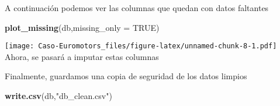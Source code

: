 \documentclass[
]{article}
\newenvironment{Shaded}{\begin{snugshade}}{\end{snugshade}}
\newcommand{\CommentTok}[1]{\textcolor[rgb]{0.56,0.35,0.01}{\textit{#1}}}
\newcommand{\DataTypeTok}[1]{\textcolor[rgb]{0.13,0.29,0.53}{#1}}
\newcommand{\KeywordTok}[1]{\textcolor[rgb]{0.13,0.29,0.53}{\textbf{#1}}}
\newcommand{\NormalTok}[1]{#1}
\newcommand{\OperatorTok}[1]{\textcolor[rgb]{0.81,0.36,0.00}{\textbf{#1}}}
\newcommand{\OtherTok}[1]{\textcolor[rgb]{0.56,0.35,0.01}{#1}}
\newcommand{\StringTok}[1]{\textcolor[rgb]{0.31,0.60,0.02}{#1}}
\begin{document}
A continuación podemos ver las columnas que quedan con datos faltantes

\begin{Shaded}
\begin{Highlighting}[]
\KeywordTok{plot_missing}\NormalTok{(db,}\DataTypeTok{missing_only =} \OtherTok{TRUE}\NormalTok{)}
\end{Highlighting}
\end{Shaded}

\texttt{[image: Caso-Euromotors\_files/figure-latex/unnamed-chunk-8-1.pdf]}
Ahora, se pasará a imputar estas columnas

\begin{Shaded}
\end{Shaded}

Finalmente, guardamos una copia de seguridad de los datos limpios

\begin{Shaded}
\begin{Highlighting}[]
\KeywordTok{write.csv}\NormalTok{(db,}\StringTok{"db_clean.csv"}\NormalTok{)}
\end{Highlighting}
\end{Shaded}
\end{document}

